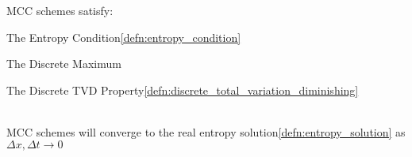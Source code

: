 \begin{defnbox}\nospacing
    \begin{defn}\label{defn:monotone_consistent_convervative_schemes}
        MCC schemes satisfy:
        \begin{circlelistnosep}
            \item The Entropy Condition\cref{defn:entropy_condition}
            \item The Discrete Maximum 
            \item The Discrete TVD Property\cref{defn:discrete_total_variation_diminishing}
        \end{circlelistnosep}
    \end{defn}
\end{defnbox}
\begin{corbox}\nospacing
    \begin{cor}\label{cor:monotone_consistent_convervative_schemes}\leavevmode\\
        MCC schemes will converge to the real entropy solution\cref{defn:entropy_solution} as $\Delta x,\Delta t\to0$
    \end{cor}
\end{corbox}

